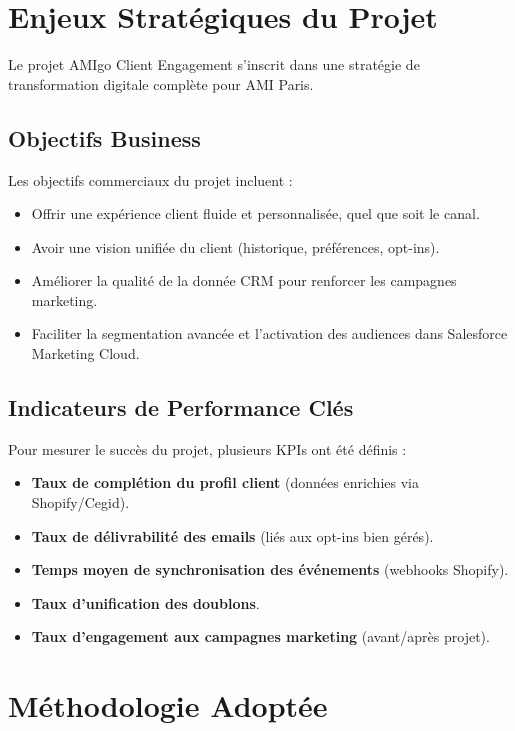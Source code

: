 \section{Enjeux Stratégiques du Projet}

Le projet AMIgo Client Engagement s'inscrit dans une stratégie de transformation digitale complète pour AMI Paris.

\subsection{Objectifs Business}

Les objectifs commerciaux du projet incluent :

\begin{itemize}
    \item Offrir une expérience client fluide et personnalisée, quel que soit le canal.
    \item Avoir une vision unifiée du client (historique, préférences, opt-ins).
    \item Améliorer la qualité de la donnée CRM pour renforcer les campagnes marketing.
    \item Faciliter la segmentation avancée et l'activation des audiences dans Salesforce Marketing Cloud.
\end{itemize}

\subsection{Indicateurs de Performance Clés}

Pour mesurer le succès du projet, plusieurs KPIs ont été définis :

\begin{itemize}
    \item \textbf{Taux de complétion du profil client} (données enrichies via Shopify/Cegid).
    \item \textbf{Taux de délivrabilité des emails} (liés aux opt-ins bien gérés).
    \item \textbf{Temps moyen de synchronisation des événements} (webhooks Shopify).
    \item \textbf{Taux d'unification des doublons}.
    \item \textbf{Taux d'engagement aux campagnes marketing} (avant/après projet).
\end{itemize}

\section{Méthodologie Adoptée}

